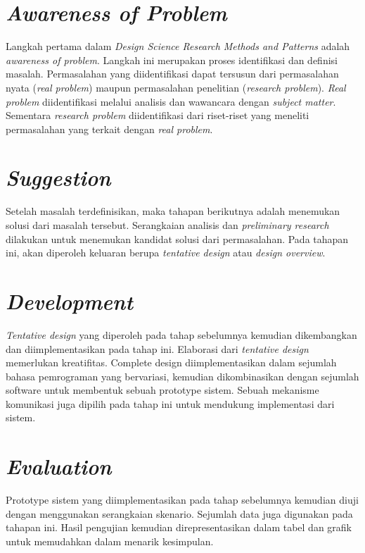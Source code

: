 \section{\textit{Awareness of Problem}}
Langkah pertama dalam \textit{Design Science Research Methods and Patterns} adalah \textit{awareness of problem}. Langkah ini merupakan proses identifikasi dan definisi masalah. Permasalahan yang diidentifikasi dapat tersusun dari permasalahan nyata (\textit{real problem}) maupun permasalahan penelitian (\textit{research problem}). \textit{Real problem} diidentifikasi melalui analisis dan wawancara dengan \textit{subject matter}. Sementara \textit{research problem} diidentifikasi dari riset-riset yang meneliti permasalahan yang terkait dengan \textit{real problem}.


\section{\textit{Suggestion}}
Setelah masalah terdefinisikan, maka tahapan berikutnya adalah menemukan solusi dari masalah tersebut. Serangkaian analisis dan \textit{preliminary research} dilakukan untuk menemukan kandidat solusi dari permasalahan. Pada tahapan ini, akan diperoleh keluaran berupa \textit{tentative design} atau \textit{design overview}.


\section{\textit{Development}}
\textit{Tentative design} yang diperoleh pada tahap sebelumnya kemudian dikembangkan dan diimplementasikan pada tahap ini. Elaborasi dari \textit{tentative design} memerlukan kreatifitas. Complete design diimplementasikan dalam sejumlah bahasa pemrograman yang bervariasi, kemudian dikombinasikan dengan sejumlah software untuk membentuk sebuah prototype sistem. Sebuah mekanisme komunikasi juga dipilih pada tahap ini untuk mendukung implementasi dari sistem.


\section{\textit{Evaluation}}
Prototype sistem yang diimplementasikan pada tahap sebelumnya kemudian diuji dengan menggunakan serangkaian skenario. Sejumlah data juga digunakan pada tahapan ini. Hasil pengujian kemudian direpresentasikan dalam tabel dan grafik untuk memudahkan dalam menarik kesimpulan.


